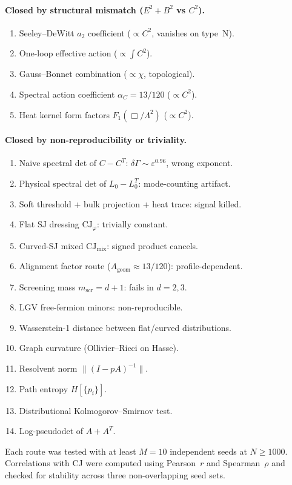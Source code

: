 \documentclass[12pt,a4paper]{article}
\theoremstyle{plain}
\theoremstyle{definition}
\theoremstyle{remark}
\newcommand{\CJ}{\mathrm{CJ}}
\begin{document}
\paragraph{Closed by structural mismatch ($E^2 + B^2$ vs $C^2$).}
\begin{enumerate}[resume]
\item Seeley--DeWitt $a_2$ coefficient ($\propto C^2$, vanishes
  on type~N).
\item One-loop effective action ($\propto \int C^2$).
\item Gauss--Bonnet combination ($\propto \chi$, topological).
\item Spectral action coefficient $\alpha_C = 13/120$
  ($\propto C^2$).
\item Heat kernel form factors $F_1(\Box/\Lambda^2)$
  ($\propto C^2$).
\end{enumerate}

\paragraph{Closed by non-reproducibility or triviality.}
\begin{enumerate}[resume]
\item Naive spectral det of $C - C^T$: $\delta\Gamma \sim
  \varepsilon^{0.96}$, wrong exponent.
\item Physical spectral det of $L_0 - L_0^T$: mode-counting
  artifact.
\item Soft threshold + bulk projection + heat trace: signal
  killed.
\item Flat SJ dressing $\CJ_\varphi$: trivially constant.
\item Curved-SJ mixed $\CJ_{\mathrm{mix}}$: signed product
  cancels.
\item Alignment factor route ($A_{\mathrm{geom}} \approx
  13/120$): profile-dependent.
\item Screening mass $m_{\mathrm{scr}} = d+1$: fails in
  $d = 2, 3$.
\item LGV free-fermion minors: non-reproducible.
\item Wasserstein-1 distance between flat/curved
  distributions.
\item Graph curvature (Ollivier--Ricci on Hasse).
\item Resolvent norm $\|(I - pA)^{-1}\|$.
\item Path entropy $H[\{p_i\}]$.
\item Distributional Kolmogorov--Smirnov test.
\item Log-pseudodet of $A + A^T$.
\end{enumerate}

Each route was tested with at least $M = 10$ independent seeds
at $N \geq 1000$.  Correlations with CJ were computed using
Pearson~$r$ and Spearman~$\rho$ and checked for stability across
three non-overlapping seed sets.



\end{document}

